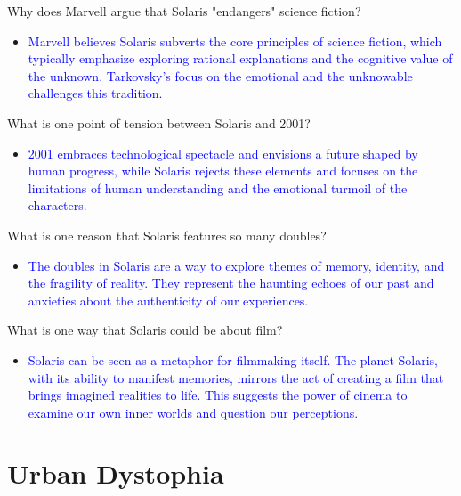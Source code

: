 \documentclass[11pt,fleqn]{book} %
\begin{document}
\begin{exercise}
Why does Marvell argue that Solaris "endangers" science fiction?
\begin{itemize}
\item \textcolor{blue}{Marvell believes Solaris subverts the core principles of science fiction, which typically emphasize exploring rational explanations and the cognitive value of the unknown. Tarkovsky's focus on the emotional and the unknowable challenges this tradition.}
\end{itemize}
\end{exercise}

\begin{exercise}
What is one point of tension between Solaris and 2001?
\begin{itemize}
\item \textcolor{blue}{2001 embraces technological spectacle and envisions a future shaped by human progress, while Solaris  rejects these elements and focuses on the limitations of human understanding and the emotional turmoil of the characters. }
\end{itemize}
\end{exercise}

\begin{exercise}
What is one reason that Solaris features so many doubles?
\begin{itemize}
    \item \textcolor{blue}{The doubles in Solaris are a way to explore themes of memory, identity, and the fragility of reality. They represent the haunting echoes of our past and anxieties about the authenticity of our experiences.}
\end{itemize}
\end{exercise}

\begin{exercise}
What is one way that Solaris could be about film?
\begin{itemize}
    \item \textcolor{blue}{Solaris can be seen as a metaphor for filmmaking itself. The planet Solaris, with its ability to manifest memories, mirrors the act of creating a film that brings imagined realities to life. This suggests the power of cinema to examine our own inner worlds and question our perceptions.}
\end{itemize}
\end{exercise}




\section{Urban Dystophia}
\end{document}
